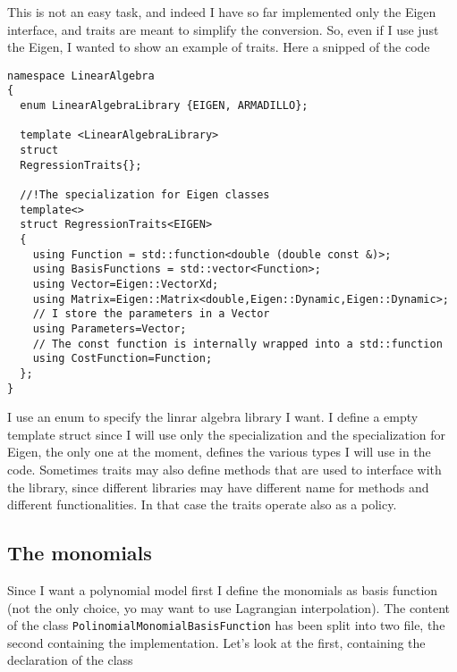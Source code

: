 \documentclass{article}
\newcommand{\li}{\lstinline}
\begin{document}
This is not an easy task, and indeed I have so far implemented only the Eigen interface, and traits are meant to simplify the conversion. So, even if I use just the Eigen, I wanted to show an example of traits. Here a snipped of the code
\begin{lstlisting}[title={RegressionTraits.hpp}]
namespace LinearAlgebra
{
  enum LinearAlgebraLibrary {EIGEN, ARMADILLO};

  template <LinearAlgebraLibrary>
  struct
  RegressionTraits{};

  //!The specialization for Eigen classes
  template<>
  struct RegressionTraits<EIGEN>
  {
    using Function = std::function<double (double const &)>;
    using BasisFunctions = std::vector<Function>; 
    using Vector=Eigen::VectorXd;
    using Matrix=Eigen::Matrix<double,Eigen::Dynamic,Eigen::Dynamic>;
    // I store the parameters in a Vector
    using Parameters=Vector;
    // The const function is internally wrapped into a std::function
    using CostFunction=Function;
  };
}
\end{lstlisting}
I use an enum to specify the linrar algebra library I want. I define a empty template struct since I will use only the specialization and the
specialization for Eigen, the only one at the moment,
defines the various types I will use in the code.  Sometimes traits
may also define methods that are used to interface with the library,
since different libraries may have different name for methods and different
functionalities. In that case the traits operate also as a policy.
\subsection{The monomials}
Since I want a polynomial model first I define the monomials as basis function (not the only choice, yo may want to use Lagrangian interpolation).
The content of the class \li!PolinomialMonomialBasisFunction! has been split into two file, the second containing the implementation. Let's look at the first, containing the declaration of the class
\end{document}
